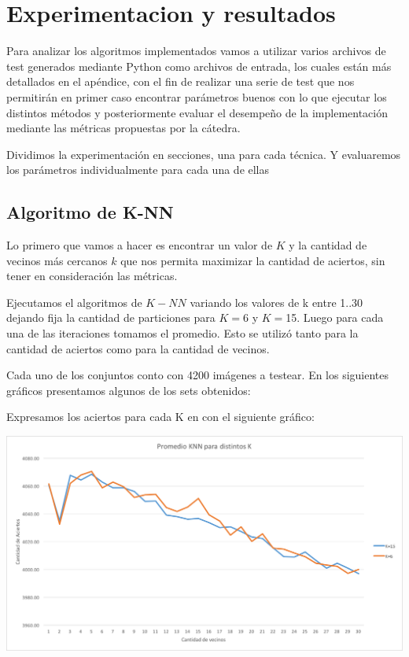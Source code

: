 \section{Experimentacion y resultados}

Para analizar los algoritmos implementados vamos a utilizar varios archivos de test generados mediante Python como archivos de entrada, los cuales están más detallados en el apéndice, con el fin de realizar una serie de test que nos permitirán en primer caso encontrar parámetros buenos con lo que ejecutar los distintos métodos y posteriormente evaluar el desempeño de la implementación mediante las métricas propuestas por la cátedra.

Dividimos la experimentación en secciones, una para cada técnica. Y evaluaremos los parámetros individualmente para cada una de ellas

\subsection {Algoritmo de K-NN}

Lo primero que vamos a hacer es encontrar un valor de $K$ y la cantidad de vecinos más cercanos $k$ que nos permita maximizar la cantidad de aciertos, sin tener en consideración las métricas.

Ejecutamos el algoritmos de $K-NN$ variando los valores de k entre {1..30} dejando fija la cantidad de particiones para $K=$6 y $K=$15. Luego para cada una de las iteraciones tomamos el promedio. Esto se utilizó tanto para la cantidad de aciertos como para la cantidad de vecinos.

Cada uno de los conjuntos conto con 4200 imágenes a testear. En los siguientes gráficos presentamos algunos de los sets obtenidos:

Expresamos los aciertos para cada K en con el siguiente gráfico:
\begin{center}
\includegraphics[scale=0.6]{imagenes/AciertosKNN.png}
\end{center}

